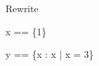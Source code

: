 \begin{zsection}
  \SECTION Rewrite
\end{zsection}

\begin{zed}
  x == \{1\}
\end{zed}

\begin{zed}
  y == \{x : x | x = 3\}
\end{zed}


